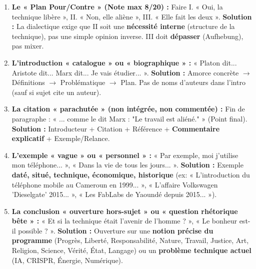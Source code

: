 \documentclass[11pt]{article}
\begin{document}
\begin{attention}
\begin{enumerate}
    \item \textbf{Le « Plan Pour/Contre » (Note max 8/20) :} Faire I. « Oui, la technique libère », II. « Non, elle aliène », III. « Elle fait les deux ». \textbf{Solution :} La dialectique exige que II soit une \textbf{nécessité interne} (structure de la technique), pas une simple opinion inverse. III doit \textbf{dépasser} (Aufhebung), pas mixer.
    \item \textbf{L'introduction « catalogue » ou « biographique » :} « Platon dit... Aristote dit... Marx dit... Je vais étudier... ». \textbf{Solution :} Amorce concrète $\rightarrow$ Définitions $\rightarrow$ Problématique $\rightarrow$ Plan. Pas de noms d'auteurs dans l'intro (sauf si sujet cite un auteur).
    \item \textbf{La citation « parachutée » (non intégrée, non commentée) :} Fin de paragraphe : « ... comme le dit Marx : "Le travail est aliéné." » (Point final). \textbf{Solution :} Introducteur + Citation + Référence + \textbf{Commentaire explicatif} + Exemple/Relance.
    \item \textbf{L'exemple « vague » ou « personnel » :} « Par exemple, moi j'utilise mon téléphone... », « Dans la vie de tous les jours... ». \textbf{Solution :} Exemple \textbf{daté, situé, technique, économique, historique} (ex: « L'introduction du téléphone mobile au Cameroun en 1999... », « L'affaire Volkswagen 'Dieselgate' 2015... », « Les FabLabs de Yaoundé depuis 2015... »).
    \item \textbf{La conclusion « ouverture hors-sujet » ou « question rhétorique bête » :} « Et si la technique était l'avenir de l'homme ? », « Le bonheur est-il possible ? ». \textbf{Solution :} Ouverture sur une \textbf{notion précise du programme} (Progrès, Liberté, Responsabilité, Nature, Travail, Justice, Art, Religion, Science, Vérité, État, Langage) ou un \textbf{problème technique actuel} (IA, CRISPR, Énergie, Numérique).
\end{enumerate}
\end{attention}
\end{document}
